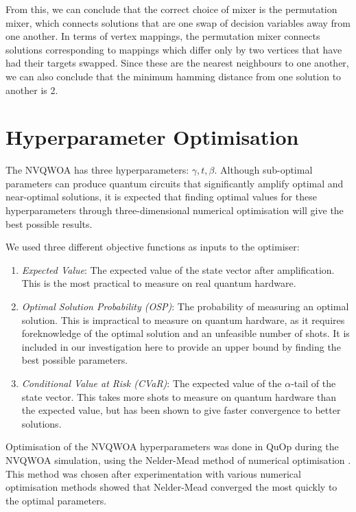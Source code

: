 From this, we can conclude that the correct choice of mixer is the permutation mixer, which connects solutions that are one swap of decision variables away from one another. In terms of vertex mappings, the permutation mixer connects solutions corresponding to mappings which differ only by two vertices that have had their targets swapped. Since these are the nearest neighbours to one another, we can also conclude that the minimum hamming distance from one solution to another is 2.

\section{Hyperparameter Optimisation} \label{sec:parameters}
The NVQWOA has three hyperparameters: $\gamma, t, \beta$. Although sub-optimal parameters can produce quantum circuits that significantly amplify optimal and near-optimal solutions, it is expected that finding optimal values for these hyperparameters through three-dimensional numerical optimisation will give the best possible results.\cite{bennett2024analysisnonvariationalquantumwalkbased}
 
We used three different objective functions as inputs to the optimiser:
\begin{enumerate}
    \item \textit{Expected Value}: The expected value of the state vector after amplification. This is the most practical to measure on real quantum hardware.
    \item \textit{Optimal Solution Probability (OSP)}: The probability of measuring an optimal solution. This is impractical to measure on quantum hardware, as it requires foreknowledge of the optimal solution and an unfeasible number of shots. It is included in our investigation here to provide an upper bound by finding the best possible parameters.
    \item \textit{Conditional Value at Risk (CVaR)}: The expected value of the $\alpha$-tail of the state vector. This takes more shots to measure on quantum hardware than the expected value, but has been shown to give faster convergence to better solutions.\cite{CVaR_quantum}
\end{enumerate}
Optimisation of the NVQWOA hyperparameters was done in QuOp during the NVQWOA simulation, using the Nelder-Mead method of numerical optimisation \cite{nelder_mead}. This method was chosen after experimentation with various numerical optimisation methods showed that Nelder-Mead converged the most quickly to the optimal parameters.

